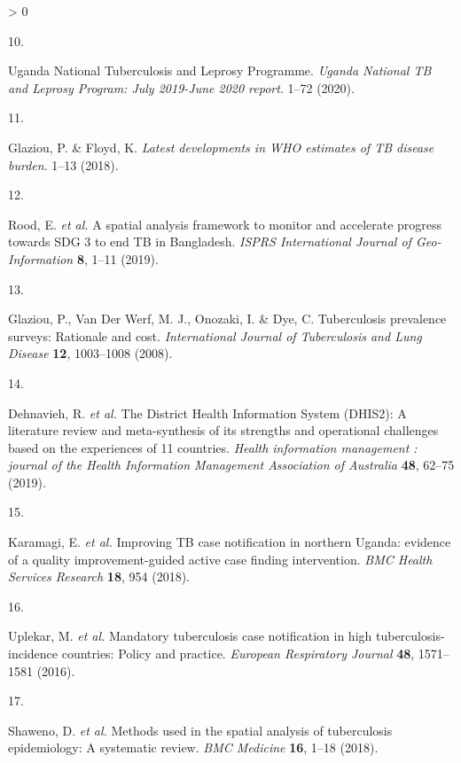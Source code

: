\documentclass[
]{article}
\newlength{\cslhangindent}
\newlength{\csllabelwidth}
\newenvironment{CSLReferences}[2] %
 {%
  \setlength{\parindent}{0pt}
  \ifodd #1 \everypar{\setlength{\hangindent}{\cslhangindent}}\ignorespaces\fi
  \ifnum #2 > 0
  \setlength{\parskip}{#2\baselineskip}
  \fi
 }%
 {}
\newcommand{\CSLLeftMargin}[1]{\parbox[t]{\csllabelwidth}{#1}}
\newcommand{\CSLRightInline}[1]{\parbox[t]{\linewidth - \csllabelwidth}{#1}\break}
\begin{document}
\begin{CSLReferences}{0}{0}
\leavevmode\hypertarget{ref-UgandaNationalTuberculosisandLeprosyProgramme2020}{}%
\CSLLeftMargin{10. }
\CSLRightInline{Uganda National Tuberculosis and Leprosy Programme. \emph{{Uganda National TB and Leprosy Program: July 2019-June 2020 report}}. 1--72 (2020).}

\leavevmode\hypertarget{ref-Glaziou2018a}{}%
\CSLLeftMargin{11. }
\CSLRightInline{Glaziou, P. \& Floyd, K. \emph{{Latest developments in WHO estimates of TB disease burden}}. 1--13 (2018).}

\leavevmode\hypertarget{ref-Rood2019}{}%
\CSLLeftMargin{12. }
\CSLRightInline{Rood, E. \emph{et al.} {A spatial analysis framework to monitor and accelerate progress towards SDG 3 to end TB in Bangladesh}. \emph{ISPRS International Journal of Geo-Information} \textbf{8}, 1--11 (2019).}

\leavevmode\hypertarget{ref-Glaziou2008}{}%
\CSLLeftMargin{13. }
\CSLRightInline{Glaziou, P., Van Der Werf, M. J., Onozaki, I. \& Dye, C. {Tuberculosis prevalence surveys: Rationale and cost}. \emph{International Journal of Tuberculosis and Lung Disease} \textbf{12}, 1003--1008 (2008).}

\leavevmode\hypertarget{ref-Dehnavieh2019}{}%
\CSLLeftMargin{14. }
\CSLRightInline{Dehnavieh, R. \emph{et al.} {The District Health Information System (DHIS2): A literature review and meta-synthesis of its strengths and operational challenges based on the experiences of 11 countries}. \emph{Health information management : journal of the Health Information Management Association of Australia} \textbf{48}, 62--75 (2019).}

\leavevmode\hypertarget{ref-Karamagi2018}{}%
\CSLLeftMargin{15. }
\CSLRightInline{Karamagi, E. \emph{et al.} {Improving TB case notification in northern Uganda: evidence of a quality improvement-guided active case finding intervention}. \emph{BMC Health Services Research} \textbf{18}, 954 (2018).}

\leavevmode\hypertarget{ref-Uplekar2016}{}%
\CSLLeftMargin{16. }
\CSLRightInline{Uplekar, M. \emph{et al.} {Mandatory tuberculosis case notification in high tuberculosis-incidence countries: Policy and practice}. \emph{European Respiratory Journal} \textbf{48}, 1571--1581 (2016).}

\leavevmode\hypertarget{ref-Shaweno2018}{}%
\CSLLeftMargin{17. }
\CSLRightInline{Shaweno, D. \emph{et al.} {Methods used in the spatial analysis of tuberculosis epidemiology: A systematic review}. \emph{BMC Medicine} \textbf{16}, 1--18 (2018).}


\end{CSLReferences}
\end{document}
